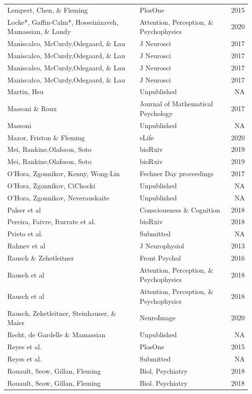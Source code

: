 \documentclass[
]{article}
\begin{document}
\begin{longtable}[t]{llr}
Lempert, Chen, \& Fleming & PlosOne & 2015\\
Locke*, Gaffin-Cahn*, Hosseinizaveh, Mamassian, \& Landy & Attention, Perception, \& Psychophysics & 2020\\
\addlinespace
Maniscalco, McCurdy,Odegaard, \& Lau & J Neurosci & 2017\\
Maniscalco, McCurdy,Odegaard, \& Lau & J Neurosci & 2017\\
Maniscalco, McCurdy,Odegaard, \& Lau & J Neurosci & 2017\\
Maniscalco, McCurdy,Odegaard, \& Lau & J Neurosci & 2017\\
Martin, Hsu & Unpublished & NA\\
\addlinespace
Massoni \& Roux & Journal of Mathematical Psychology & 2017\\
Massoni & Unpublished & NA\\
Mazor, Friston \& Fleming & eLife & 2020\\
Mei, Rankine,Olafsson, Soto & bioRxiv & 2019\\
Mei, Rankine,Olafsson, Soto & bioRxiv & 2019\\
\addlinespace
O'Hora, Zgonnikov, Kenny, Wong-Lin & Fechner Day proceedings & 2017\\
O'Hora, Zgonnikov, CiChocki & Unpublished & NA\\
O'Hora, Zgonnikov, Neverauskaite & Unpublished & NA\\
Palser et al & Consciousness \& Cognition & 2018\\
Pereira, Faivre, Iturrate et al. & bioRxiv & 2018\\
\addlinespace
Prieto et al. & Submitted & NA\\
Rahnev et al & J Neurophysiol & 2013\\
Rausch \& Zehetleitner & Front Psychol & 2016\\
Rausch et al & Attention, Perception, \& Psychophysics & 2018\\
Rausch et al & Attention, Perception, \& Psychophysics & 2018\\
\addlinespace
Rausch, Zehetleitner, Steinhauser, \& Maier & NeuroImage & 2020\\
Recht, de Gardelle \& Mamassian & Unpublished & NA\\
Reyes et al. & PlosOne & 2015\\
Reyes et al. & Submitted & NA\\
Rouault, Seow, Gillan, Fleming & Biol. Psychiatry & 2018\\
\addlinespace
Rouault, Seow, Gillan, Fleming & Biol. Psychiatry & 2018\\

\end{longtable}
\end{document}
